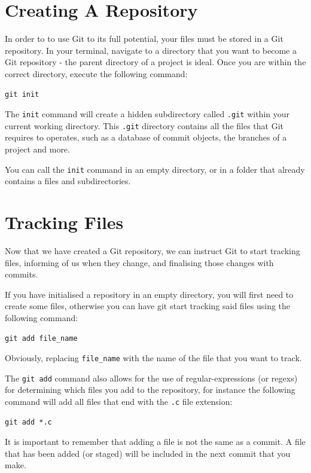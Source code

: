 \documentclass[11pt, a4paper, titlepage]{article}
\begin{document}
\section{Creating A Repository}
In order to to use Git to its full potential, your files must be stored in a
Git repository.
In your terminal, navigate to a directory that you want to become a Git
repository - the parent directory of a project is ideal.
Once you are within the correct directory, execute the following command:

\begin{lstlisting}[label=lst_init,
caption=Initialising a new Git repository]
 git init 
\end{lstlisting}

The {\tt init} command will create a hidden subdirectory called {\tt .git}
within your current working directory.
This {\tt .git} directory contains all the files that Git requires to
operates, such as a database of commit objects, the branches of a project and
more.

You can call the {\tt init} command in an empty directory, or in a folder that
already contains a files and subdirectories.



\section{Tracking Files}
Now that we have created a Git repository, we can instruct Git to start
tracking files, informing of us when they change, and finalising those changes
with commits. 

If you have initialised a repository in an empty directory, you will first
need to create some files, otherwise you can have git start tracking said
files using the following command:

\begin{lstlisting}[label=lst_add_file,
caption=Adding a file to the Stagging area.]
 git add file_name
\end{lstlisting}
Obviously, replacing {\tt file\_name} with the name of the file that you want
to track.

The {\tt git add} command also allows for the use of regular-expressions (or
regexs) for determining which files you add to the repository, for instance the
following command will add all files that end with the {\tt .c} file
extension:

\begin{lstlisting}[label=lst_add_regex,
caption=Adding all files ending with .c file etension.]
 git add *.c
\end{lstlisting}
It is important to remember that adding a file is not the same as a commit.
A file that has been added (or staged) will be included in the next commit
that you make.
\end{document}
